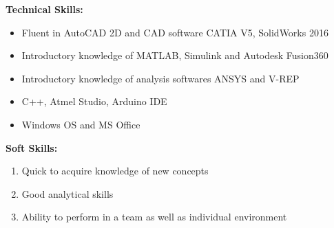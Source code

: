 \documentclass{article}
\begin{document}
\begin{flushleft}
		\medskip
		\textbf{Technical Skills:} 
		\begin{itemize}
			\item Fluent in AutoCAD 2D and CAD software CATIA V5, SolidWorks 2016
			\item Introductory knowledge of MATLAB, Simulink and Autodesk Fusion360
			\item Introductory knowledge of analysis softwares ANSYS and V-REP
			\item C++, Atmel Studio, Arduino IDE
			\item Windows OS and MS Office
		\end{itemize}
		
		\medskip
		\textbf{Soft Skills:} 
		\begin{enumerate}
			\item Quick to acquire knowledge of new concepts
			\item Good analytical skills
			\item Ability to perform in a team as well as individual environment
		\end{enumerate}
		
	\end{flushleft}
\end{document}
